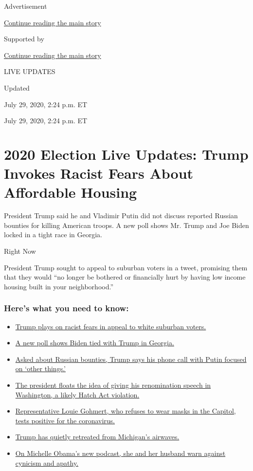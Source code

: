 Advertisement

\protect\hyperlink{after-top}{Continue reading the main story}

Supported by

\protect\hyperlink{after-sponsor}{Continue reading the main story}

LIVE UPDATES

Updated~

July 29, 2020, 2:24 p.m. ET

July 29, 2020, 2:24 p.m. ET

\hypertarget{2020-election-live-updates-trump-invokes-racist-fears-about-affordable-housing}{%
\section{2020 Election Live Updates: Trump Invokes Racist Fears About
Affordable
Housing}\label{2020-election-live-updates-trump-invokes-racist-fears-about-affordable-housing}}

President Trump said he and Vladimir Putin did not discuss reported
Russian bounties for killing American troops. A new poll shows Mr. Trump
and Joe Biden locked in a tight race in Georgia.

Right Now

President Trump sought to appeal to suburban voters in a tweet,
promising them that they would ``no longer be bothered or financially
hurt by having low income housing built in your neighborhood.''

\hypertarget{heres-what-you-need-to-know}{%
\subsubsection{Here's what you need to
know:}\label{heres-what-you-need-to-know}}

\begin{itemize}
\tightlist
\item
  \protect\hyperlink{link-62c7451e}{Trump plays on racist fears in
  appeal to white suburban voters.}
\item
  \protect\hyperlink{link-44f0348}{A new poll shows Biden tied with
  Trump in Georgia.}
\item
  \protect\hyperlink{link-1550d1d7}{Asked about Russian bounties, Trump
  says his phone call with Putin focused on `other things.'}
\item
  \protect\hyperlink{link-7eba6945}{The president floats the idea of
  giving his renomination speech in Washington, a likely Hatch Act
  violation.}
\item
  \protect\hyperlink{link-64f2c322}{Representative Louie Gohmert, who
  refuses to wear masks in the Capitol, tests positive for the
  coronavirus.}
\item
  \protect\hyperlink{link-389bb2b4}{Trump has quietly retreated from
  Michigan's airwaves.}
\item
  \protect\hyperlink{link-3cd89811}{On Michelle Obama's new podcast, she
  and her husband warn against cynicism and apathy.}
\end{itemize}

